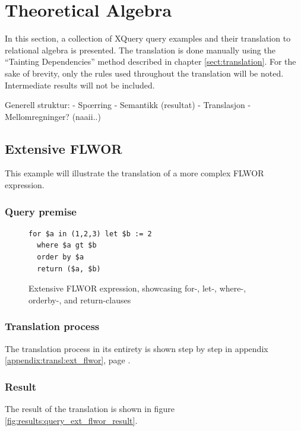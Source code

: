 \section{Theoretical Algebra}
\label{sect:result:theoretical_algebra}
In this section, a collection of XQuery query examples and their translation to
relational algebra is presented. The translation is done manually using the
``Tainting Dependencies'' method described in chapter \ref{sect:translation}. For the sake of
brevity, only the rules used throughout the translation will be noted. Intermediate results will
not be included.

Generell struktur:
- Sp\oe rring
- Semantikk (resultat)
- Translasjon
- Mellomregninger? (naaii..)

\subsection{Extensive FLWOR}
This example will illustrate the translation of a more complex FLWOR expression.

\subsubsection{Query premise}
\begin{figure}[!htp]
\begin{center}
\begin{Verbatim}
for $a in (1,2,3) let $b := 2
  where $a gt $b
  order by $a
  return ($a, $b)
\end{Verbatim}
  \caption{Extensive FLWOR expression, showcasing for-, let-, where-, orderby-,
  and return-clauses}
  \label{fig:results:query_ext_flwor}
\end{center}
\end{figure}

\subsubsection{Translation process}
The translation process in its entirety is shown step by step in appendix
\ref{appendix:transl:ext_flwor}, page \pageref{appendix:transl:ext_flwor}.

\subsubsection{Result}
The result of the translation is shown in figure
\ref{fig:results:query_ext_flwor_result}.

